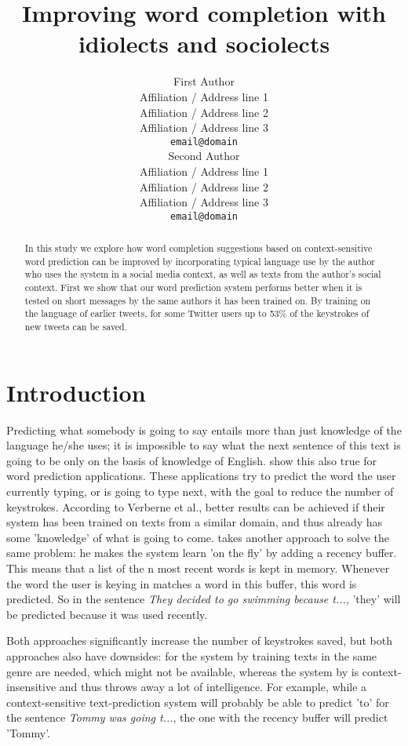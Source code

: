 \documentclass[11pt]{article}
\title{Improving word completion with idiolects and sociolects}
\author{First Author \\
  Affiliation / Address line 1 \\
  Affiliation / Address line 2 \\
  Affiliation / Address line 3 \\
  {\tt email@domain} \\\And
  Second Author \\
  Affiliation / Address line 1 \\
  Affiliation / Address line 2 \\
  Affiliation / Address line 3 \\
  {\tt email@domain} \\}
\date{}
\begin{document}
\maketitle

\begin{abstract} 
In this study we explore how word completion suggestions based on context-sensitive word prediction can be improved by incorporating typical language use by the author who uses the system in a social media context, as well as texts from the author's social context. First we show that our word prediction system performs better when it is tested on short messages by the same authors it has been trained on. By training on the language of earlier tweets, for some Twitter users up to 53\% of the keystrokes of new tweets can be saved. 
\end{abstract}

\section{Introduction}
Predicting what somebody is going to say entails more than just knowledge of the language he/she uses; it is impossible to say what the next sentence of this text is going to be only on the basis of knowledge of English.  show this also true for word prediction applications. These applications try to predict the word the user currently typing, or is going to type next, with the goal to reduce the number of keystrokes. According to Verberne et al., better results can be achieved if their system has been trained on texts from a similar domain, and thus already has some 'knowledge' of what is going to come.  takes another approach to solve the same problem: he makes the system learn 'on the fly' by adding a recency buffer. This means that a list of the n most recent words is kept in memory. Whenever the word the user is keying in matches a word in this buffer, this word is predicted. So in the sentence \emph{They decided to go swimming because t...}, 'they' will be predicted because it was used recently.

Both approaches significantly increase the number of keystrokes saved, but both approaches also have downsides: for the system by  training texts in the same genre are needed, which might not be available, whereas the system by  is context-insensitive and thus throws away a lot of intelligence. For example, while a context-sensitive text-prediction system will probably be able to predict 'to' for the sentence \emph{Tommy was going t...}, the one with the recency buffer will predict 'Tommy'.
\end{document}
